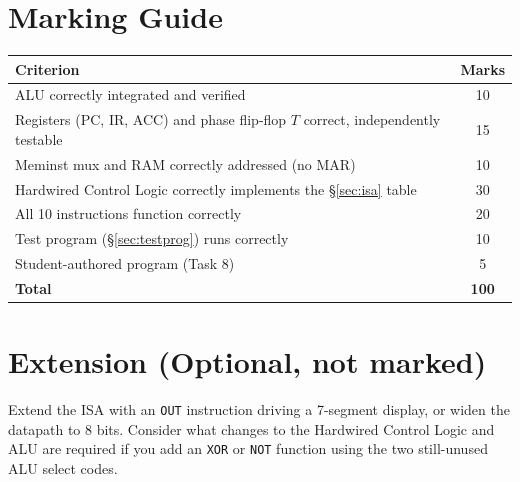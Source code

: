 \documentclass[11pt,a4paper]{article}
\begin{document}
\section{Marking Guide}

\begin{center}
\begin{tabular}{@{}p{10.4cm}c@{}}
\toprule
\textbf{Criterion} & \textbf{Marks} \\
\midrule
ALU correctly integrated and verified & 10 \\
Registers (PC, IR, ACC) and phase flip-flop $T$ correct, independently testable & 15 \\
Meminst mux and RAM correctly addressed (no MAR) & 10 \\
Hardwired Control Logic correctly implements the \S\ref{sec:isa} table & 30 \\
All 10 instructions function correctly & 20 \\
Test program (\S\ref{sec:testprog}) runs correctly & 10 \\
Student-authored program (Task 8) & 5 \\
\midrule
\textbf{Total} & \textbf{100} \\
\bottomrule
\end{tabular}
\end{center}

\section*{Extension (Optional, not marked)}
Extend the ISA with an \texttt{OUT} instruction driving a 7-segment display,
or widen the datapath to 8 bits. Consider what changes to the Hardwired
Control Logic and ALU are required if you add an \texttt{XOR} or
\texttt{NOT} function using the two still-unused ALU select codes.
\end{document}
